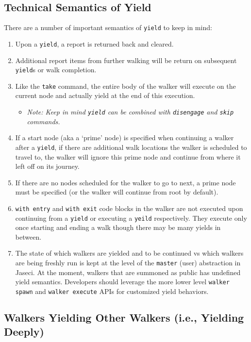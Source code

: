 \subsection{Technical Semantics of Yield}
\par
There are a number of important semantics of \lstinline{yield} to keep in mind:
\begin{enumerate}
    \item Upon a \lstinline{yield}, a report is returned back and cleared.
    \item Additional report items from further walking will be return on subsequent \lstinline{yield}s or walk completion.
    \item Like the \lstinline{take} command, the entire body of the walker will execute on the current node and actually yield at the end of this execution.
          \begin{itemize}
              \item \emph{Note: Keep in mind \lstinline{yield} can be combined with \lstinline{disengage} and \lstinline{skip} commands.}
          \end{itemize}
    \item If a start node (aka a `prime' node) is specified when continuing a walker after a \lstinline{yield}, if there are additional walk locations the walker is scheduled to travel to, the walker will ignore this prime node and continue from where it left off on its journey.
    \item If there are no nodes scheduled for the walker to go to next, a prime node must be specified (or the walker will continue from root by default).
    \item \lstinline{with entry} and \lstinline{with exit} code blocks in the walker are not executed upon continuing from a \lstinline{yield} or executing a \lstinline{yeild} respectively. They execute only once starting and ending a walk though there may be many yields in between.
    \item The state of which walkers are yielded and to be continued vs which walkers are being freshly run is kept at the level of the \texttt{master} (user) abstraction in Jaseci. At the moment, walkers that are summoned as public has undefined yield semantics. Developers should leverage the more lower level \texttt{walker spawn} and \texttt{walker execute} APIs for customized yield behaviors.
\end{enumerate}

\subsection{Walkers Yielding Other Walkers (i.e., Yielding Deeply)}

